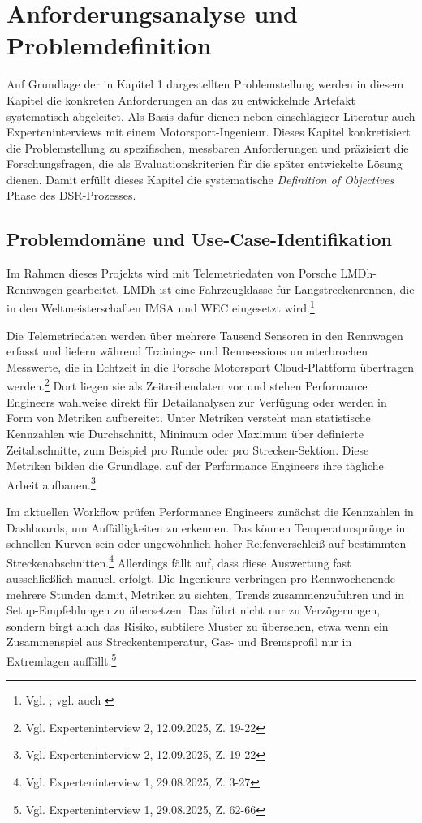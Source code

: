 \chapter{Anforderungsanalyse und Problemdefinition}
Auf Grundlage der in Kapitel 1 dargestellten Problemstellung werden in diesem Kapitel die konkreten Anforderungen an das zu entwickelnde Artefakt systematisch abgeleitet. Als Basis dafür dienen neben einschlägiger Literatur auch Experteninterviews mit einem Motorsport-Ingenieur. Dieses Kapitel konkretisiert die Problemstellung zu spezifischen, messbaren Anforderungen und präzisiert die Forschungsfragen, die als Evaluationskriterien für die später entwickelte Lösung dienen. Damit erfüllt dieses Kapitel die systematische \textit{Definition of Objectives} Phase des DSR-Prozesses.

\section{Problemdomäne und Use-Case-Identifikation}

Im Rahmen dieses Projekts wird mit Telemetriedaten von Porsche \ac{LMDh}-Rennwagen 
gearbeitet.  \ac{LMDh} ist eine Fahrzeugklasse für 
Langstreckenrennen, die in den Weltmeisterschaften \ac{IMSA} und \ac{WEC} eingesetzt wird.\footnote{Vgl. 
\cite{Porsche2023LMDh}; vgl. auch \cite{24hLeMans2025Classes}}

Die Telemetriedaten werden über mehrere Tausend Sensoren in den Rennwagen erfasst und liefern 
während Trainings- und Rennsessions ununterbrochen Messwerte, die in Echtzeit 
in die Porsche Motorsport Cloud-Plattform übertragen werden.\footnote{Vgl. 
Experteninterview 2, 12.09.2025, Z. 19-22}
Dort liegen sie als Zeitreihendaten vor und stehen Performance Engineers wahlweise direkt für Detailanalysen zur Verfügung oder werden in Form von Metriken aufbereitet. Unter Metriken versteht man statistische Kennzahlen wie Durchschnitt, Minimum oder Maximum über definierte Zeitabschnitte, zum Beispiel pro Runde oder pro Strecken-Sektion. Diese Metriken bilden die Grundlage, auf der Performance Engineers ihre tägliche Arbeit aufbauen.\footnote{Vgl. Experteninterview 2, 12.09.2025, Z. 19-22}

Im aktuellen Workflow prüfen Performance Engineers zunächst die Kennzahlen in Dashboards, um Auffälligkeiten zu erkennen. Das können Temperatursprünge in schnellen Kurven sein oder ungewöhnlich hoher Reifenverschleiß auf bestimmten Streckenabschnitten.\footnote{Vgl. Experteninterview 1, 29.08.2025, Z. 3-27} Allerdings fällt auf, dass diese Auswertung fast ausschließlich manuell erfolgt. Die Ingenieure verbringen pro Rennwochenende mehrere Stunden damit, Metriken zu sichten, Trends zusammenzuführen und in Setup-Empfehlungen zu übersetzen. Das führt nicht nur zu Verzögerungen, sondern birgt auch das Risiko, subtilere Muster zu übersehen, etwa wenn ein Zusammenspiel aus Streckentemperatur, Gas- und Bremsprofil nur in Extremlagen auffällt.\footnote{Vgl. Experteninterview 1, 29.08.2025, Z. 62-66}

